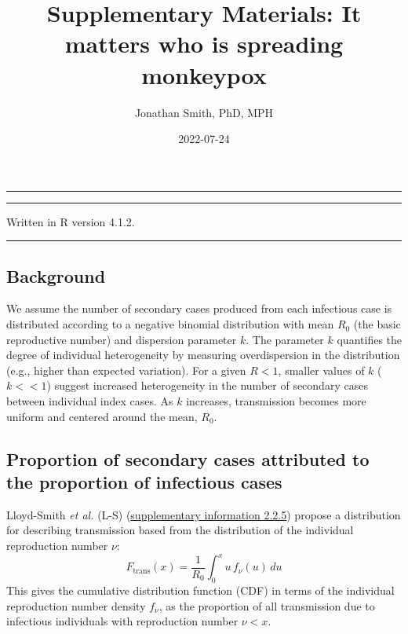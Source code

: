 \documentclass[
]{article}
\title{Supplementary Materials: It matters who is spreading monkeypox}
\author{Jonathan Smith, PhD, MPH}
\date{2022-07-24}
\begin{document}
\maketitle

\begin{center}\rule{0.5\linewidth}{0.5pt}\end{center}

\begin{center}\rule{0.5\linewidth}{0.5pt}\end{center}

Written in R version 4.1.2.

\begin{center}\rule{0.5\linewidth}{0.5pt}\end{center}

\hypertarget{background}{%
\subsection{Background}\label{background}}

We assume the number of secondary cases produced from each infectious
case is distributed according to a negative binomial distribution with
mean \(R_0\) (the basic reproductive number) and dispersion parameter
\(k\). The parameter \(k\) quantifies the degree of individual
heterogeneity by measuring overdispersion in the distribution (e.g.,
higher than expected variation). For a given \(R<1\), smaller values of
\(k\) (\(k<<1\)) suggest increased heterogeneity in the number of
secondary cases between individual index cases. As \(k\) increases,
transmission becomes more uniform and centered around the mean, \(R_0\).

\hypertarget{proportion-of-secondary-cases-attributed-to-the-proportion-of-infectious-cases}{%
\subsection{Proportion of secondary cases attributed to the proportion
of infectious
cases}\label{proportion-of-secondary-cases-attributed-to-the-proportion-of-infectious-cases}}

Lloyd-Smith \emph{et al.} (L-S)
(\href{https://static-content.springer.com/esm/art\%3A10.1038\%2Fnature04153/MediaObjects/41586_2005_BFnature04153_MOESM1_ESM.pdf}{supplementary
information 2.2.5}) propose a distribution for describing transmission
based from the distribution of the individual reproduction number
\(\nu\):
\[ F_\mathrm{trans}(x) = \frac{1}{R_0} \int_0^x u\,  f_\nu (u) \, du \]
This gives the cumulative distribution function (CDF) in terms of the
individual reproduction number density \(f_\nu\), as the proportion of
all transmission due to infectious individuals with reproduction number
\(\nu <x\).
\end{document}
